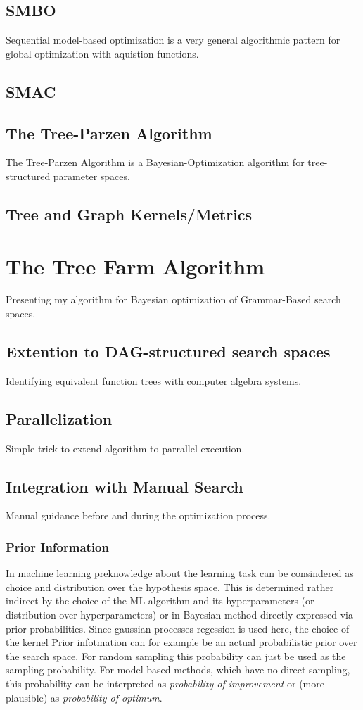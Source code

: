 \documentclass[english]{article}
\begin{document}
\subsection{SMBO}
Sequential model-based optimization is a very general algorithmic pattern for global optimization with aquistion functions.
\subsection{SMAC}


\subsection{The Tree-Parzen Algorithm}
The Tree-Parzen Algorithm \cite{bergstra_algorithms_2011} is a Bayesian-Optimization algorithm for tree-structured parameter spaces.

\subsection{Tree and Graph Kernels/Metrics}


\section{The Tree Farm Algorithm}
Presenting my algorithm for Bayesian optimization of Grammar-Based search spaces.

\subsection{Extention to DAG-structured search spaces}
Identifying equivalent function trees with computer algebra systems.

\subsection{Parallelization}
Simple trick to extend algorithm to parrallel execution.

\subsection{Integration with Manual Search}
Manual guidance before and during the optimization process.

\subsubsection{Prior Information}
In machine learning preknowledge about the learning task can be consindered as choice and distribution over the hypothesis space. This is determined rather indirect by the choice of the \ac{ML}-algorithm and its hyperparameters (or distribution over hyperparameters) or in Bayesian method directly expressed via prior probabilities. Since gaussian processes regession is used here, the choice of the kernel
Prior infotmation can for example be an actual probabilistic prior over the search space. For random sampling this probability can just be used as the sampling probability. For model-based methods, which have no direct sampling, this probability can be interpreted as \textit{probability of improvement} or (more plausible) as \textit{probability of optimum}.
\end{document}
